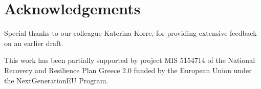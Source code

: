 \section{Acknowledgements}

Special thanks to our colleague Katerina Korre, for providing extensive feedback on an earlier draft.

This work has been partially supported by project MIS 5154714 of the National Recovery and Resilience Plan Greece 2.0 funded by the European Union under the NextGenerationEU Program.